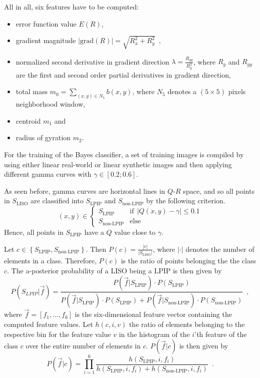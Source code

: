 All in all, six features have to be computed:
\begin{itemize}
	\item error function value $E(R)$,
	\item gradient magnitude $\left|\mathrm{grad}(R)\right| = \sqrt{R_x^2+R_y^2}$\ ,
	\item normalized second derivative in gradient direction $\lambda = \frac{R_{gg}}{R_g^2}$, where $R_g$ and $R_{gg}$ are the first and second order partial derivatives in gradient direction,
	\item total mass $m_0 = \sum\limits_{(x,y)\in N_5} b(x,y)$, where $N_5$ denotes a $(5 \times 5)$ pixels neighborhood window,
	\item centroid $m_1$ and
	\item radius of gyration $m_2$.
\end{itemize}

For the training of the Bayes classifier, a set of training images is compiled by using either linear real-world or linear synthetic images and then applying different gamma curves with $\gamma \in [0.2; 0.6]$. 

As seen before, gamma curves are horizontal lines in $Q$-$R$ space, and so all points in $S_\text{LISO}$ are classified into $S_\text{LPIP}$ and $S_\text{non-LPIP}$ by the following criterion.
\begin{equation}
	(x,y) \in 
	\begin{cases}
	  S_\text{LPIP}				&\text{if} \ \ \left|Q(x,y) - \gamma\right| \leq 0.1 \\
	  S_\text{non-LPIP}		&\text{else}
	\end{cases}
	\label{eq:lpipclassification}
\end{equation}
Hence, all points in $S_\text{LPIP}$ have a $Q$ value close to $\gamma$. 

Let $c \in \left\{S_\text{LPIP}, S_\text{non-LPIP}\right\}$. Then $P(c) = \frac{\left|c\right|}{\left|S_\text{LISO}\right|}$, where $\left|\cdot\right|$ denotes the number of elements in a class. Therefore, $P(c)$ is the ratio of points belonging the the class $c$. The a-posterior probability of a LISO being a LPIP is then given by
\begin{equation}
	P(S_{LPIP}| \vec{f}) = 
	\frac{P(\vec{f}|S_\text{LPIP}) \cdot P(S_\text{LPIP})}{P(\vec{f}|S_\text{LPIP}) \cdot P(S_\text{LPIP}) + P(\vec{f}|S_\text{non-LPIP}) \cdot P(S_\text{non-LPIP})} \enspace ,
	\label{eq:aposterior}
\end{equation}
where $\vec{f} = [f_1, ..., f_6]$ is the six-dimensional feature vector containing the computed feature values. Let $h(c, i, v)$ the ratio of elements belonging to the respective bin for the feature value $v$ in the histogram of the $i$'th feature of the class $c$ over the entire number of elements in $c$. $P(\vec{f}|c)$ is then given by
\begin{equation}
	P(\vec{f}|c) = \prod\limits_{i=1}^{6} \frac{h(S_\text{LPIP}, i, f_i)}{h(S_\text{LPIP}, i, f_i) + h(S_\text{non-LPIP}, i, f_i)} \enspace .
	\label{eq:featureratios}
\end{equation}

